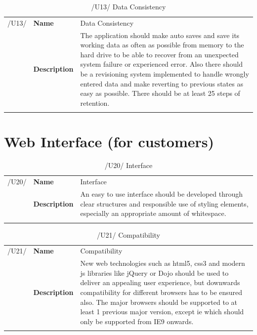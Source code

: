 \documentclass[11pt,a4paper,oneside,svgnames]{report}
\begin{document}
\begin{table}[H]
\centering
\begin{tabular}{llp{8.75cm}}
\cellcolor{white}/U13/	& \textbf{Name}			& Data Consistency\\
\cellcolor{white}		& \textbf{Description}	& The application should make auto saves and save its working data as often as possible from memory to the hard drive to be able to recover from an unexpected system failure or experienced error. Also there should be a revisioning system implemented to handle wrongly entered data and make reverting to previous states as easy as possible. There should be at least 25 steps of retention.\\
\cellcolor{white}		\hfill \\
\end{tabular}
\caption{/U13/ Data Consistency}
\label{tab:u13}
\end{table}


\section{Web Interface (for customers)}
\begin{table}[H]
\centering
\begin{tabular}{llp{8.75cm}}
\cellcolor{white}/U20/	& \textbf{Name}			& Interface\\
\cellcolor{white}		& \textbf{Description}	& An easy to use interface should be developed through clear structures and responsible use of styling elements, especially an appropriate amount of whitespace.\\
\cellcolor{white}		\hfill \\
\end{tabular}
\caption{/U20/ Interface}
\label{tab:u20}
\end{table}

\begin{table}[H]
\centering
\begin{tabular}{llp{8.75cm}}
\cellcolor{white}/U21/	& \textbf{Name}			& Compatibility\\
\cellcolor{white}		& \textbf{Description}	& New web technologies such as \acrshort{html}5, \acrshort{css}3 and modern \gls{js} libraries like jQuery or Dojo should be used to deliver an appealing user experience, but downwards compatibility for different browsers has to be ensured also. The major browsers should be supported to at least 1 previous major version, except \gls{ie} which should only be supported from IE9 onwards.\\
\cellcolor{white}		\hfill \\
\end{tabular}
\caption{/U21/ Compatibility}
\label{tab:u21}
\end{table}
\end{document}

